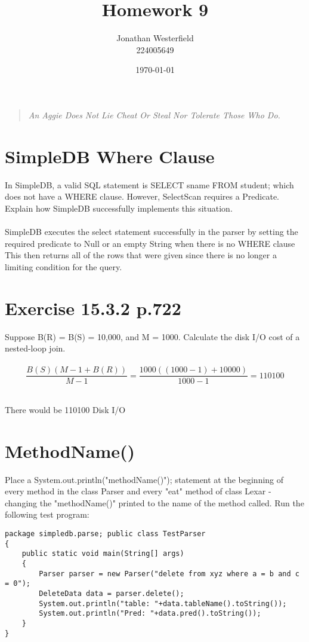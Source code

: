 \documentclass [letter,12pt] {article}
\begin{document}
\title{
    \huge{\textbf{Homework 9}}
}
\author{
    Jonathan Westerfield \\
    224005649
}
\date{\today}
\maketitle

\begin{quote}
\centering
\textit {
    An Aggie Does Not Lie Cheat Or Steal Nor Tolerate Those Who Do. \\
}
\vspace {1.4in}
\hrulefill
\end{quote}
\newpage

\section{SimpleDB Where Clause}
    In SimpleDB, a valid SQL statement is SELECT sname FROM  student; which does not
    have a WHERE clause. However, SelectScan requires a Predicate. Explain how
    SimpleDB successfully implements this situation.
    \\
    \\
    SimpleDB executes the select statement successfully in the parser by setting 
    the required predicate to Null or an empty String when there is no WHERE clause
    This then returns all of the rows that were given since there is no longer
    a limiting condition for the query.
    
    
\section{Exercise 15.3.2 p.722}
    Suppose B(R) = B(S) = 10,000, and M = 1000. Calculate the disk I/O cost
    of a nested-loop join.
    \\
    \\
    \[\frac{B(S)(M-1 + B(R))}{M-1} = \frac{1000((1000-1) + 10000)}{1000-1} = 110100\] 
    \\
    \begin{center}
        There would be 110100 Disk I/O
    \end{center}
    
    
\section{MethodName()}
    Place a System.out.println("methodName()"); statement at the beginning of every
    method in the class Parser and every "eat" method of class Lexar - changing the
    "methodName()" printed to the name of the method called. Run the following test
    program:
    \begin{verbatim}
package simpledb.parse; public class TestParser 
{
    public static void main(String[] args) 
    {
        Parser parser = new Parser("delete from xyz where a = b and c = 0");
        DeleteData data = parser.delete();
        System.out.println("table: "+data.tableName().toString());
        System.out.println("Pred: "+data.pred().toString());
    } 
}
    \end{verbatim}
    
\end{document}
